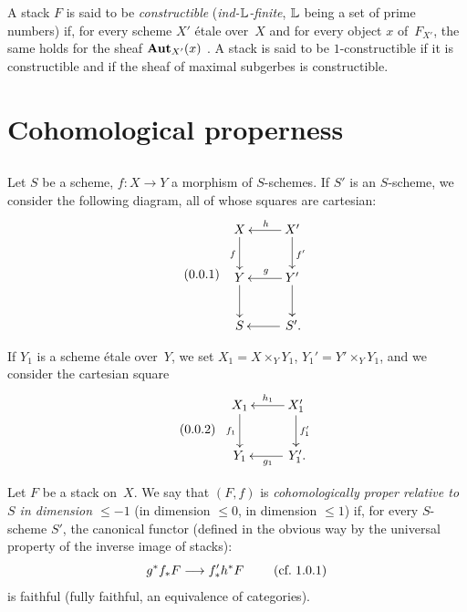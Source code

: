 A stack $F$ is said to be \emph{constructible}
(\emph{\resp ind-$\mathbb{L}$-finite},
$\mathbb{L}$ being a set of prime numbers) if, for every
scheme $X'$ \'etale over~$X$ and for every object $x$ of~$F_{X'}$,
the same holds for the sheaf $\operatorname{\mathbf{Aut}}_{X'}(x)$ \cite[VII 2.2.1]{XIII.2}. A stack is
said to be $1$-constructible
if it is constructible and if the sheaf of maximal subgerbes is
constructible.

\section{Cohomological properness}
\label{XIII.1}
%
\setcounter{subsection}{-1}
\subsection{}
\label{XIII.1.0}
%
Let $S$ be a scheme, $f \colon X \to Y$ a morphism of
$S$-schemes. If $S'$ is an $S$-scheme, we consider the
following diagram, all of whose squares are cartesian:
\begin{equation*}
\label{eq:XIII.1.0.1}
\tag{\thesubsection.1}
\begin{array}{c}
\xymatrix{ X \ar[d]_f & \ar[l]_h X'
\ar[d]^{f'} \\ Y \ar[d] & \ar[l]_g Y' \ar[d] \\ S & \ar[l] \,S'. }
\end{array}
\end{equation*}

If $Y_1$ is a scheme \'etale over~$Y$, we set $X_1 =
X \times_Y Y_1$, $Y_1' = Y' \times_Y Y_1$, and we consider the
cartesian square
\begin{equation*}
\label{eq:XIII.1.0.2}
\tag{\thesubsection.2}
\begin{array}{c}
\xymatrix{ X_1 \ar[d]_{f_1} & \ar[l]_{h_1}
X_1' \ar[d]^{f_1'} \\ Y_1 & \ar[l]^{g_1} \,Y_1'. }
\end{array}
\end{equation*}

\begin{definition}
\label{XIII.1.1}
Let $F$ be a stack on~$X$. We say that $(F,f)$ is
\emph{cohomologically proper relative to~$S$ in dimension
$\leqslant -1$}
(\resp in dimension $\leqslant 0$, \resp in dimension $\leqslant 1$)
if, for every $S$-scheme $S'$, the canonical functor (defined
in the obvious way by the universal property of
the inverse image of stacks):
$$
g^* f_* F \to f'_* h^* F \qquad\text{ (\cf 1.0.1)}
$$
is faithful (\resp fully faithful, \resp an equivalence
of categories).
\end{definition}

